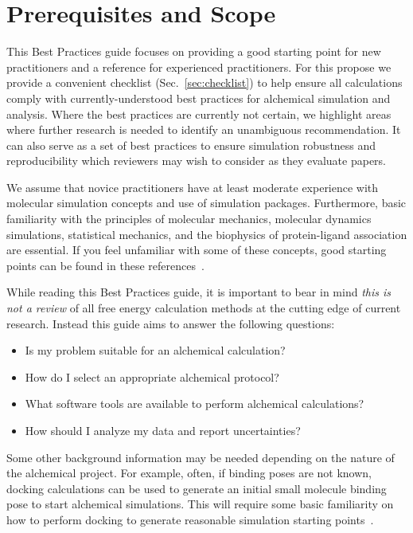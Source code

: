 \documentclass[9pt,bestpractices]{livecoms}
\begin{document}
\section{Prerequisites and Scope}
\label{sec:pre}
This Best Practices guide focuses on providing a good starting point for new practitioners and a reference for experienced practitioners. 
 For this propose we provide a convenient checklist (Sec.~\ref{sec:checklist}) to help ensure all calculations comply with currently-understood best practices for alchemical simulation and analysis. Where the best practices are currently not certain, we highlight areas where further research is needed to identify an unambiguous recommendation.
 It can also serve as a set of best practices to ensure simulation robustness and reproducibility which reviewers may wish to consider as they evaluate papers.

 We assume that novice practitioners have at least moderate experience with molecular simulation concepts and use of simulation packages. 
 Furthermore, basic familiarity with the principles of molecular mechanics, molecular dynamics simulations, statistical mechanics, and the biophysics of protein-ligand association are essential. If you feel unfamiliar with some of these concepts, good starting points can be found in these references~\cite{braun2019best, grossfield2018best, klimovich2015guidelines, shirts2012best}. 

 While reading this Best Practices guide, it is important to bear in mind \emph{this is not a review} of all free energy calculation methods at the cutting edge of current research.
Instead this guide aims to answer the following questions:
\begin{itemize}
    \item Is my problem suitable for an alchemical calculation? 
     \item How do I select an appropriate alchemical protocol? 
     \item What software tools are available to perform alchemical calculations? 
     \item How should I analyze my data and report uncertainties? 
\end{itemize}


Some other background information may be needed depending on the nature of the alchemical project. For example, often, if binding poses are not known, docking calculations can be used to generate an initial small molecule binding pose to start alchemical simulations. This will require some basic familiarity on how to perform docking to generate reasonable simulation starting points~\cite{grinter2014challenges}. 
\end{document}
